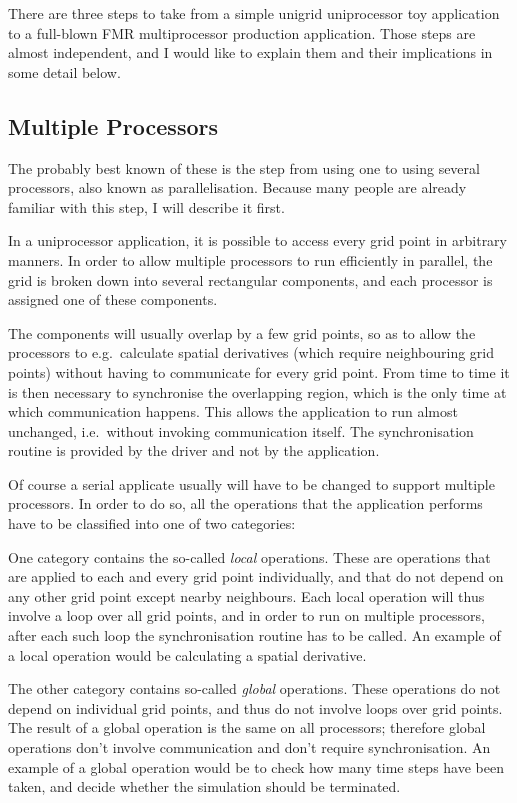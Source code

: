 There are three steps to take from a simple unigrid uniprocessor toy
application to a full-blown FMR multiprocessor production application.
Those steps are almost independent, and I would like to explain them
and their implications in some detail below.

\subsection{Multiple Processors}

The probably best known of these is the step from using one to using
several processors, also known as parallelisation.  Because many
people are already familiar with this step, I will describe it first.

In a uniprocessor application, it is possible to access every grid
point in arbitrary manners.  In order to allow multiple processors to
run efficiently in parallel, the grid is broken down into several
rectangular components, and each processor is assigned one of these
components.

The components will usually overlap by a few grid points, so as to
allow the processors to e.g.\ calculate spatial derivatives (which
require neighbouring grid points) without having to communicate for
every grid point.  From time to time it is then necessary to
synchronise the overlapping region, which is the only time at which
communication happens.  This allows the application to run almost
unchanged, i.e.\ without invoking communication itself.  The
synchronisation routine is provided by the driver and not by the
application.

Of course a serial applicate usually will have to be changed to
support multiple processors.  In order to do so, all the operations
that the application performs have to be classified into one of two
categories:

One category contains the so-called \emph{local} operations.  These
are operations that are applied to each and every grid point
individually, and that do not depend on any other grid point except
nearby neighbours.  Each local operation will thus involve a loop over
all grid points, and in order to run on multiple processors, after
each such loop the synchronisation routine has to be called.  An
example of a local operation would be calculating a spatial
derivative.

The other category contains so-called \emph{global} operations.  These
operations do not depend on individual grid points, and thus do not
involve loops over grid points.  The result of a global operation is
the same on all processors; therefore global operations don't involve
communication and don't require synchronisation.  An example of a
global operation would be to check how many time steps have been
taken, and decide whether the simulation should be terminated.

